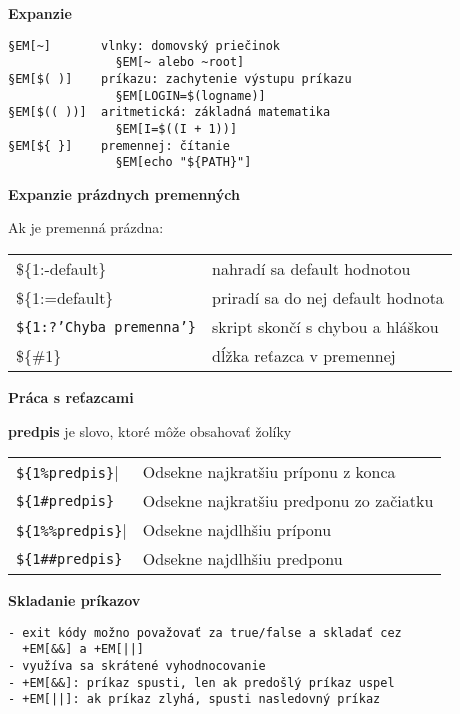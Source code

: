 \documentclass[8pt,landscape]{extarticle}
\newcommand{\Heading}[1]{%
{\begin{center}\bfseries\Large#1\end{center}}%
}%
\newcommand{\Em}[1]{\Ovalbox{\ttfamily #1}}
\newenvironment{karticka}[1]%
{%
\Heading{#1}%
}%
{%
\clearpage
}%
\begin{document}
\begin{karticka}{Expanzie}
\begin{Verbatim}[commandchars=§\[\]]
§EM[~]       vlnky: domovský priečinok
               §EM[~ alebo ~root]
§EM[$( )]    príkazu: zachytenie výstupu príkazu
               §EM[LOGIN=$(logname)]
§EM[$(( ))]  aritmetická: základná matematika
               §EM[I=$((I + 1))]
§EM[${ }]    premennej: čítanie
               §EM[echo "${PATH}"]
\end{Verbatim}
\end{karticka}
\begin{karticka}{Expanzie prázdnych premenných}
Ak je premenná \Em{1} prázdna:
\begin{table}[h!]
\begin{tabular}{lp{4cm}}
\$\{1:-default\}
&   nahradí sa default hodnotou
\\
\$\{1:=default\}
&   priradí sa do nej default hodnota
\\
\texttt{\$\{1:?'Chyba premenna'\}}
&   skript skončí s chybou a hláškou
\\
\$\{\#1\}
&
   dĺžka reťazca v premennej
\end{tabular}
\end{table}
\end{karticka}
\begin{karticka}{Práca s reťazcami}
\textbf{predpis} je slovo, ktoré môže obsahovať žolíky
\begin{table}[h!]
\begin{tabular}{lp{6cm}}
\verb|${1%predpis}|
&
Odsekne najkratšiu príponu z konca
\\[6pt]
\verb|${1#predpis}|
&
Odsekne najkratšiu predponu zo začiatku
\\[6pt]
\verb|${1%%predpis}|
&
Odsekne najdlhšiu príponu
\\[6pt]
\verb|${1##predpis}|
&
Odsekne najdlhšiu predponu
\end{tabular}
\end{table}
\end{karticka}
\begin{karticka}{Skladanie príkazov}
\begin{Verbatim}[commandchars=+\[\]]
- exit kódy možno považovať za true/false a skladať cez
  +EM[&&] a +EM[||]
- využíva sa skrátené vyhodnocovanie
- +EM[&&]: príkaz spusti, len ak predošlý príkaz uspel
- +EM[||]: ak príkaz zlyhá, spusti nasledovný príkaz
\end{Verbatim}
\end{karticka}
\end{document}
